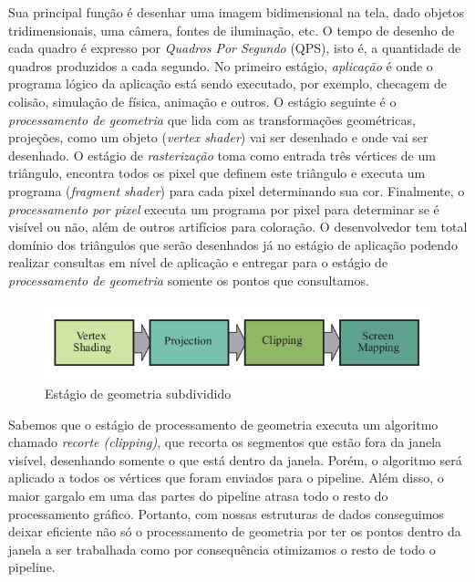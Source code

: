 Sua principal função é desenhar uma imagem bidimensional na tela, dado objetos tridimensionais, uma câmera, fontes de iluminação, etc. O tempo de desenho de cada quadro é expresso por \emph{Quadros Por Segundo} (QPS), isto é, a quantidade de quadros produzidos a cada segundo. No primeiro estágio, \emph{aplicação} é onde o programa lógico da aplicação está sendo executado, por exemplo, checagem de colisão, simulação de física, animação e outros. O estágio seguinte é o \emph{processamento de geometria} que lida com as transformações geométricas, projeções, como um objeto (\emph{vertex shader}) vai ser desenhado e onde vai ser desenhado. O estágio de \emph{rasterização} toma como entrada três vértices de um triângulo, encontra todos os pixel que definem este triângulo e executa um programa (\emph{fragment shader}) para cada pixel determinando sua cor. Finalmente, o \emph{processamento por pixel} executa um programa por pixel para determinar se é visível ou não, além de outros artifícios para coloração. O desenvolvedor tem total domínio dos triângulos que serão desenhados já no estágio de aplicação podendo realizar consultas em nível de aplicação e entregar para o estágio de \emph{processamento de geometria} somente os pontos que consultamos.

\begin{figure}[h!]
    \centering
    \includegraphics[scale=0.5]{images/Captura de tela de 2021-04-16 19-49-28.png}
    \caption{Estágio de geometria subdividido}
    \label{fig:geometry_pipeline}
\end{figure}

Sabemos que o estágio de processamento de geometria executa um algoritmo chamado \emph{recorte (clipping)}, que recorta os segmentos que estão fora da janela visível, desenhando somente o que está dentro da janela. Porém, o algoritmo será aplicado a todos os vértices que foram enviados para o pipeline. Além disso, o maior gargalo em uma das partes do pipeline atrasa todo o resto do processamento gráfico. Portanto, com nossas estruturas de dados conseguimos deixar eficiente não só o processamento de geometria por ter os pontos dentro da janela a ser trabalhada como por consequência otimizamos o resto de todo o pipeline. 

